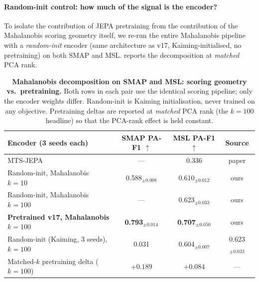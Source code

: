\documentclass{article}
\begin{document}
\paragraph{Random-init control: how much of the signal is the encoder?} To isolate the contribution of JEPA pretraining from the contribution of the Mahalanobis scoring geometry itself, we re-run the entire Mahalanobis pipeline with a \emph{random-init} encoder (same architecture as v17, Kaiming-initialised, no pretraining) on both SMAP and MSL.  reports the decomposition at \emph{matched} PCA rank.

\begin{table}[h]
\centering
\caption{\textbf{Mahalanobis decomposition on SMAP and MSL: scoring geometry vs.\ pretraining.} Both rows in each pair use the identical scoring pipeline; only the encoder weights differ. Random-init is Kaiming initialisation, never trained on any objective. Pretraining deltas are reported at \emph{matched} PCA rank (the $k=100$ headline) so that the PCA-rank effect is held constant.}
\label{tab:randinit}
\small
\begin{tabular}{@{}lccc@{}}
\toprule
Encoder (3 seeds each) & SMAP PA-F1 $\uparrow$ & MSL PA-F1 $\uparrow$ & Source \\
\midrule
MTS-JEPA~\citep{mtsjepa2026}                    & ---                 & 0.336          & paper \\
\midrule
Random-init, Mahalanobis $k=10$                 & 0.588$_{\pm0.008}$  & 0.610$_{\pm0.012}$  & ours \\
Random-init, Mahalanobis $k=100$                & ---                 & 0.623$_{\pm0.033}$  & ours \\
\textbf{Pretrained v17, Mahalanobis $k=100$}    & \textbf{0.793}$_{\pm0.014}$ & \textbf{0.707}$_{\pm0.050}$ & ours \\
\midrule
Random-init (Kaiming, 3 seeds), $k{=}100$                & 0.031              & 0.604$_{\pm0.007}$ & 0.623$_{\pm0.033}$ \\
Matched-$k$ pretraining delta ($k{=}100$)                & $+0.189$            & $+0.084$       & --- \\
\bottomrule
\end{tabular}
\end{table}
\end{document}

